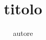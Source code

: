 \author{autore}
\title{titolo}
\label{cha:nomeautoredata}
\begin{abstract}

\end{abstract}
\maketitle
{}

